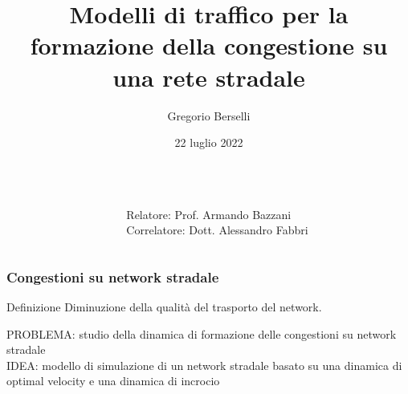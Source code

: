 \documentclass[11pt,]{beamer}
\title[]{Modelli di traffico per la formazione della congestione su una rete stradale} %
\author[Gregorio Berselli]{Gregorio Berselli} %
\institute[UniBO]{Laurea in Fisica \\ \smallskip Universit\`a di Bologna} %
\date[22 luglio 2022]{22 luglio 2022} %
\begin{document}

\begin{frame}
	\titlepage %
	\begin{columns}[c]
		\begin{column}{0.55\textwidth}
			
		\end{column}
		\begin{column}{0.45\textwidth}
			\raggedleft
			\scriptsize
			Relatore: Prof. Armando Bazzani \\ \smallskip
			Correlatore: Dott. Alessandro Fabbri
		\end{column}
	\end{columns}
\end{frame}


\begin{frame}
	\frametitle{Congestioni su network stradale}
	\begin{block}{Definizione}
		Diminuzione della qualit\`a del trasporto del network.
	\end{block}
	\vspace{10mm}
	PROBLEMA: studio della dinamica di formazione delle congestioni su network stradale\\ \smallskip
	IDEA: modello di simulazione di un network stradale basato su una dinamica di optimal velocity e una dinamica di incrocio
\end{frame}
\end{document}
